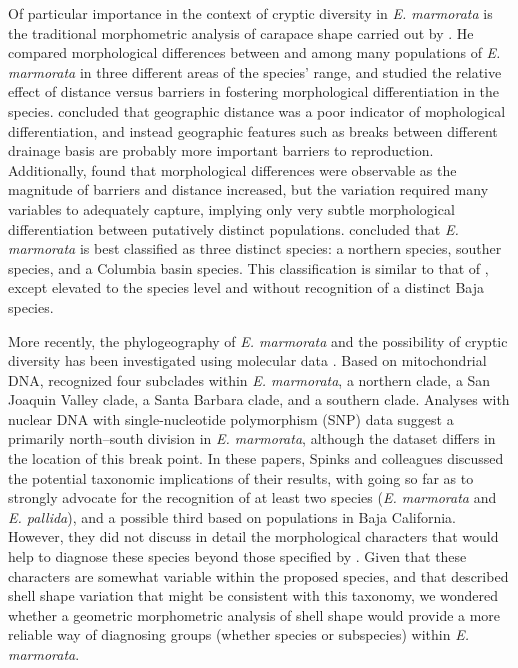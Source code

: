 \documentclass[12pt,letterpaper]{article}
\begin{document}
Of particular importance in the context of cryptic diversity in \textit{E. marmorata} is the traditional morphometric analysis of carapace shape carried out by \citet{Holland1992}. He compared morphological differences between and among many populations of \textit{E. marmorata} in three different areas of the species' range, and studied the relative effect of distance versus barriers in fostering morphological differentiation in the species. \citet{Holland1992} concluded that geographic distance was a poor indicator of mophological differentiation, and instead geographic features such as breaks between different drainage basis are probably more important barriers to reproduction. Additionally, \citet{Holland1992} found that morphological differences were observable as the magnitude of barriers and distance increased, but the variation required many variables to adequately capture, implying only very subtle morphological differentiation between putatively distinct populations. \citet{Holland1992} concluded that \textit{E. marmorata} is best classified as three distinct species: a northern species, souther species, and a Columbia basin species. This classification is similar to that of \citet{Seeliger1945}, except elevated to the species level and without recognition of a distinct Baja species. 

More recently, the phylogeography of \textit{E. marmorata} and the possibility of cryptic diversity has been investigated using molecular data \citep{Spinks2005,Spinks2010,Spinks2014}. Based on mitochondrial DNA, \citet{Spinks2005} recognized four subclades within \textit{E. marmorata}, a northern clade, a San Joaquin Valley clade, a Santa Barbara clade, and a southern clade. Analyses with nuclear DNA \citep{Spinks2010} with single-nucleotide polymorphism (SNP) data suggest a primarily north--south division in \textit{E. marmorata}, although the dataset differs in the location of this break point. In these papers, Spinks and colleagues discussed the potential taxonomic implications of their results, with \citet{Spinks2014} going so far as to strongly advocate for the recognition of at least two species (\emph{E. marmorata} and \emph{E. pallida}), and a possible third based on populations in Baja California. However, they did not discuss in detail the morphological characters that would help to diagnose these species beyond those specified by \citet{Seeliger1945}. Given that these characters are somewhat variable within the proposed species, and that \citet{Holland1992} described shell shape variation that might be consistent with this taxonomy, we wondered whether a geometric morphometric analysis of shell shape would provide a more reliable way of diagnosing groups (whether species or subspecies) within \textit{E. marmorata}.
\end{document}
